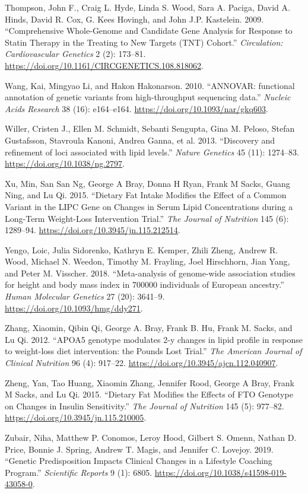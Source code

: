 \documentclass[]{article}
\begin{document}
\leavevmode\hypertarget{ref-Thompson2009}{}%
Thompson, John F., Craig L. Hyde, Linda S. Wood, Sara A. Paciga, David
A. Hinds, David R. Cox, G. Kees Hovingh, and John J.P. Kastelein. 2009.
``Comprehensive Whole-Genome and Candidate Gene Analysis for Response to
Statin Therapy in the Treating to New Targets (TNT) Cohort.''
\emph{Circulation: Cardiovascular Genetics} 2 (2): 173--81.
\url{https://doi.org/10.1161/CIRCGENETICS.108.818062}.

\leavevmode\hypertarget{ref-Wang2010}{}%
Wang, Kai, Mingyao Li, and Hakon Hakonarson. 2010. ``ANNOVAR: functional
annotation of genetic variants from high-throughput sequencing data.''
\emph{Nucleic Acids Research} 38 (16): e164--e164.
\url{https://doi.org/10.1093/nar/gkq603}.

\leavevmode\hypertarget{ref-Willer2013}{}%
Willer, Cristen J., Ellen M. Schmidt, Sebanti Sengupta, Gina M. Peloso,
Stefan Gustafsson, Stavroula Kanoni, Andrea Ganna, et al. 2013.
``Discovery and refinement of loci associated with lipid levels.''
\emph{Nature Genetics} 45 (11): 1274--83.
\url{https://doi.org/10.1038/ng.2797}.

\leavevmode\hypertarget{ref-Xu2015}{}%
Xu, Min, San San Ng, George A Bray, Donna H Ryan, Frank M Sacks, Guang
Ning, and Lu Qi. 2015. ``Dietary Fat Intake Modifies the Effect of a
Common Variant in the LIPC Gene on Changes in Serum Lipid Concentrations
during a Long-Term Weight-Loss Intervention Trial.'' \emph{The Journal
of Nutrition} 145 (6): 1289--94.
\url{https://doi.org/10.3945/jn.115.212514}.

\leavevmode\hypertarget{ref-Yengo2018}{}%
Yengo, Loic, Julia Sidorenko, Kathryn E. Kemper, Zhili Zheng, Andrew R.
Wood, Michael N. Weedon, Timothy M. Frayling, Joel Hirschhorn, Jian
Yang, and Peter M. Visscher. 2018. ``Meta-analysis of genome-wide
association studies for height and body mass index in 700000 individuals
of European ancestry.'' \emph{Human Molecular Genetics} 27 (20):
3641--9. \url{https://doi.org/10.1093/hmg/ddy271}.

\leavevmode\hypertarget{ref-Zhang2012}{}%
Zhang, Xiaomin, Qibin Qi, George A. Bray, Frank B. Hu, Frank M. Sacks,
and Lu Qi. 2012. ``APOA5 genotype modulates 2-y changes in lipid profile
in response to weight-loss diet intervention: the Pounds Lost Trial.''
\emph{The American Journal of Clinical Nutrition} 96 (4): 917--22.
\url{https://doi.org/10.3945/ajcn.112.040907}.

\leavevmode\hypertarget{ref-Zheng2015}{}%
Zheng, Yan, Tao Huang, Xiaomin Zhang, Jennifer Rood, George A Bray,
Frank M Sacks, and Lu Qi. 2015. ``Dietary Fat Modifies the Effects of
FTO Genotype on Changes in Insulin Sensitivity.'' \emph{The Journal of
Nutrition} 145 (5): 977--82.
\url{https://doi.org/10.3945/jn.115.210005}.

\leavevmode\hypertarget{ref-Zubair2019}{}%
Zubair, Niha, Matthew P. Conomos, Leroy Hood, Gilbert S. Omenn, Nathan
D. Price, Bonnie J. Spring, Andrew T. Magis, and Jennifer C. Lovejoy.
2019. ``Genetic Predisposition Impacts Clinical Changes in a Lifestyle
Coaching Program.'' \emph{Scientific Reports} 9 (1): 6805.
\url{https://doi.org/10.1038/s41598-019-43058-0}.
\end{document}
